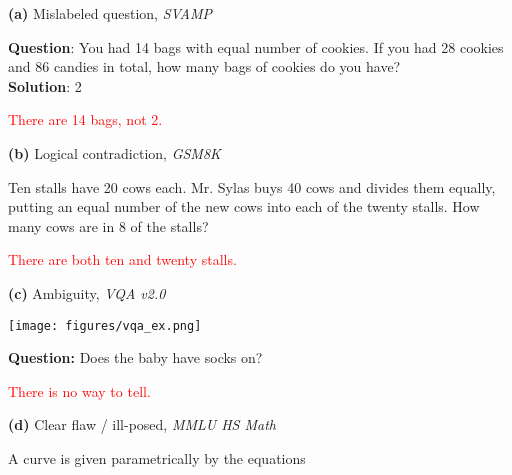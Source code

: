 \begin{figure*}[h]
\centering

\begin{tcolorbox}[colback=gray!4, colframe=gray!50, arc=2mm, boxrule=0.5pt,left=9pt,right=9pt]
\small
    
\begin{minipage}{0.48\textwidth}
\textbf{(a)} Mislabeled question, \textit{SVAMP}
\begin{tcolorbox}[colback=white, colframe=gray!50, arc=2mm, boxrule=0.5pt]
        \textbf{Question}: You had 14 bags with equal number of cookies. If you had 28 cookies and 86 candies in total, how many bags of cookies do you have?\\
\textbf{Solution}: 2
\end{tcolorbox}
\hspace{1.4em}\textcolor{red}{There are 14 bags, not 2.}
\end{minipage}
\hfill
\begin{minipage}{0.48\textwidth}
\textbf{(b)} Logical contradiction, \textit{GSM8K}
    \begin{tcolorbox}[colback=white, colframe=gray!50, arc=2mm, boxrule=0.5pt]
Ten stalls have 20 cows each. Mr. Sylas buys 40 cows and divides them equally, putting an equal number of the new cows into each of the twenty stalls. How many cows are in 8 of the stalls?
    \end{tcolorbox}
    \hspace{1.4em}\textcolor{red}{There are both ten and twenty stalls.}
\end{minipage}
\vspace{1em}

\begin{minipage}{0.45\textwidth}
\textbf{(c)} Ambiguity, \textit{VQA v2.0}
\begin{tcolorbox}[colback=white, colframe=gray!50, arc=2mm, boxrule=0.5pt]
\begin{minipage}{0.46\textwidth}
\texttt{[image: figures/vqa\_ex.png]}
\end{minipage}
\hfill
\begin{minipage}{0.42\textwidth}
\textbf{Question:} Does the baby have socks on?\footnotemark\\
\end{minipage}

\end{tcolorbox}
\hspace{1.4em}\textcolor{red}{There is no way to tell.}
\end{minipage}
\hfill
\begin{minipage}{0.48\textwidth}
\textbf{(d)} Clear flaw / ill-posed, \textit{MMLU HS Math}
    \begin{tcolorbox}[colback=white, colframe=gray!50, arc=2mm, boxrule=0.5pt]
A curve is given parametrically by the equations


\end{tcolorbox}
\end{minipage}
\end{tcolorbox}
\end{figure*}

